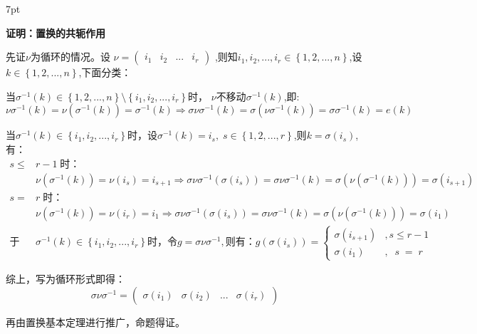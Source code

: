 \documentclass[zihao=-4,UTF8]{report}
\newenvironment{formal}{%
\def\FrameCommand{%
\hspace{1pt}%
{\color{gray}\vrule width 2pt}%
{\color{formalshade}\vrule width 4pt}%
\colorbox{formalshade}%
}%
\MakeFramed{\advance\hsize-\width\FrameRestore}%
\noindent\hspace{-4.55pt}%
\begin{adjustwidth}{}{7pt}%
\vspace{2pt}\vspace{2pt}%
}
{%
\vspace{2pt}\end{adjustwidth}\endMakeFramed%
}
\begin{document}
\begin{formal}
    \textbf{证明：置换的共轭作用}\par
    先证$\nu$为循环的情况。设
    $\nu=
    \begin{pmatrix}
        i_{1}&i_{2}&...&i_{r}
    \end{pmatrix}$
    ,则知$i_{1},i_{2},...,i_{r}\in \left \{ 1,2,...,n \right \} $,设$k\in \left \{ 1,2,...,n \right \}$,下面分类：\par
    当$\sigma^{-1}(k)\in \left \{ 1,2,...,n \right \}\setminus \left \{ i_{1},i_{2},...,i_{r} \right \}$时，
$\nu$不移动$\sigma^{-1}(k)$,即:
    \begin{equation*}
        \nu \sigma^{-1}(k)=\nu (\sigma^{-1}(k))=\sigma^{-1}(k)\Longrightarrow \sigma \nu \sigma^{-1}(k)=\sigma(\nu \sigma^{-1}(k))=\sigma \sigma^{-1}(k)=e(k)
    \end{equation*}\par
    当$\sigma^{-1}(k)\in \left \{ i_{1},i_{2},...,i_{r} \right \}$时，设$\sigma^{-1}(k)=i_{s},\;s\in \left \{ 1,2,...,r \right \}$,则$k=\sigma(i_{s})$,有：
    \begin{align*}
        s \le &r-1\;\text{时：}\\
        &\nu(\sigma^{-1}(k))=\nu(i_{s})=i_{s+1} \Longrightarrow \sigma\nu\sigma^{-1}(\sigma(i_{s}))=\sigma \nu \sigma^{-1}(k)=\sigma(\nu(\sigma^{-1}(k)))=\sigma(i_{s+1})\\
        s = &r\;\text{时：}\\
        &\nu(\sigma^{-1}(k))=\nu(i_{r})=i_{1} \Longrightarrow \sigma\nu\sigma^{-1}(\sigma(i_{s}))=\sigma \nu \sigma^{-1}(k)=\sigma(\nu(\sigma^{-1}(k)))=\sigma(i_{1})\\
        \text{于是}&\sigma^{-1}(k)\in \left \{ i_{1},i_{2},...,i_{r} \right \}\text{时，令}g=\sigma\nu\sigma^{-1},\text{则有：}g(\sigma(i_{s}))=
    \left\{\begin{matrix}
       \sigma(i_{s+1})&,s \le r-1\\
       \sigma(i_{1})&,\;\;s\;=\;r\;\;
      \end{matrix}\right.
    \end{align*}\par
    \par
    综上，写为循环形式即得：
    \begin{equation*}
        \sigma \nu \sigma^{-1}=
        \begin{pmatrix}
            \sigma(i_{1})&\sigma(i_{2})&...&\sigma(i_{r})
        \end{pmatrix}
    \end{equation*}\par
    再由置换基本定理进行推广，命题得证。
\end{formal}
\end{document}
